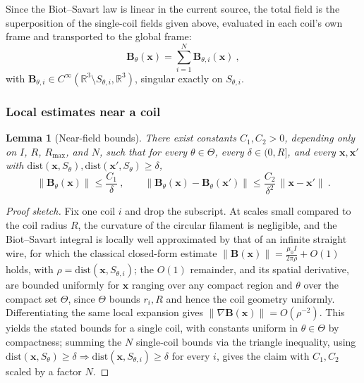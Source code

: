 \documentclass{article}
\newtheorem{lemma}{Lemma}
\begin{document}
	Since the Biot--Savart law is linear in the current source, the total field is the superposition of the single-coil fields given above, evaluated in each coil's own frame and transported to the global frame:
	\begin{equation}
		\mathbf{B}_\theta(\mathbf{x}) = \sum_{i=1}^N \mathbf{B}_{\theta,i}(\mathbf{x}) \ ,
	\end{equation}
	with $\mathbf{B}_{\theta,i} \in C^\infty(\mathbb{R}^3 \setminus S_{\theta,i}, \mathbb{R}^3)$, singular exactly on $S_{\theta,i}$.
	
	\subsubsection{Local estimates near a coil}
	
	\begin{lemma}[Near-field bounds] \label{lemma:coil_bounds}
		There exist constants $C_1, C_2 > 0$, depending only on $I$, $R$, $R_{\max}$, and $N$, such that for every $\theta \in \Theta$, every $\delta \in (0, R]$, and every $\mathbf{x}, \mathbf{x}'$ with $\mathrm{dist}(\mathbf{x}, S_\theta), \mathrm{dist}(\mathbf{x}', S_\theta) \ge \delta$,
		\begin{equation}
			\|\mathbf{B}_\theta(\mathbf{x})\| \le \frac{C_1}{\delta} \ , \qquad \|\mathbf{B}_\theta(\mathbf{x}) - \mathbf{B}_\theta(\mathbf{x}')\| \le \frac{C_2}{\delta^2}\, \|\mathbf{x} - \mathbf{x}'\| \ .
		\end{equation}
	\end{lemma}
	\begin{proof}[Proof sketch]
		Fix one coil $i$ and drop the subscript. At scales small compared to the coil radius $R$, the curvature of the circular filament is negligible, and the Biot--Savart integral is locally well approximated by that of an infinite straight wire, for which the classical closed-form estimate $\|\mathbf{B}(\mathbf{x})\| = \frac{\mu_0 I}{2\pi\rho} + O(1)$ holds, with $\rho = \mathrm{dist}(\mathbf{x}, S_{\theta,i})$; the $O(1)$ remainder, and its spatial derivative, are bounded uniformly for $\mathbf{x}$ ranging over any compact region and $\theta$ over the compact set $\Theta$, since $\Theta$ bounds $r_i, R$ and hence the coil geometry uniformly. Differentiating the same local expansion gives $\|\nabla \mathbf{B}(\mathbf{x})\| = O(\rho^{-2})$. This yields the stated bounds for a single coil, with constants uniform in $\theta \in \Theta$ by compactness; summing the $N$ single-coil bounds via the triangle inequality, using $\mathrm{dist}(\mathbf{x}, S_\theta) \ge \delta \Rightarrow \mathrm{dist}(\mathbf{x}, S_{\theta,i}) \ge \delta$ for every $i$, gives the claim with $C_1, C_2$ scaled by a factor $N$.
	\end{proof}
	
\end{document}
